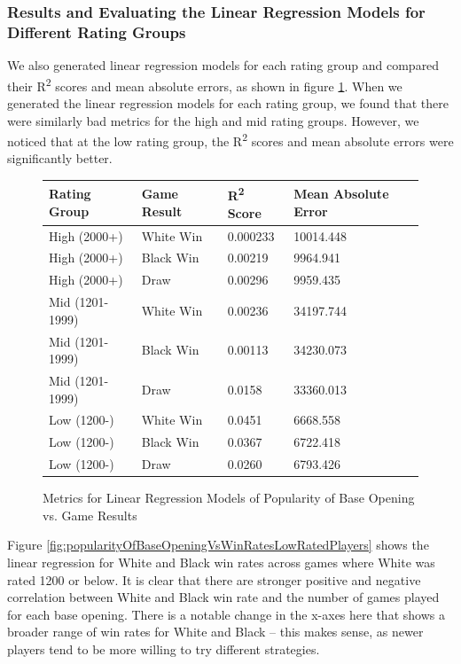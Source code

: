 \documentclass[a4paper, 11pt]{article}
\begin{document}
\subsubsection{Results and Evaluating the Linear Regression Models for Different Rating Groups}
We also generated linear regression models for each rating group and compared their R\textsuperscript{2} scores and mean absolute errors, as shown in figure \ref{fig:metricsForLinearRegressionModelsOfPopularityOfBaseOpeningVsGameResults}. When we generated the linear regression models for each rating group, we found that there were similarly bad metrics for the high and mid rating groups. However, we noticed that at the low rating group, the R\textsuperscript{2} scores and mean absolute errors were significantly better.

\begin{figure}[H]
    \centering
    \caption{Metrics for Linear Regression Models of Popularity of Base Opening vs. Game Results}
    \label{fig:metricsForLinearRegressionModelsOfPopularityOfBaseOpeningVsGameResults}
    \begin{tabular}{| l | l | l | l |} 
        \hline
        \bf{Rating Group} & \bf{Game Result} & \bf{R\textsuperscript{2} Score} & \bf{Mean Absolute Error} \\ [0.5ex] 
        \hline
        High (2000+) & White Win & 0.000233 & 10014.448 \\
        \hline
        High (2000+) & Black Win & 0.00219 & 9964.941 \\
        \hline
        High (2000+) & Draw & 0.00296 & 9959.435 \\
        \hline
        Mid (1201-1999) & White Win & 0.00236 & 34197.744 \\
        \hline
        Mid (1201-1999) & Black Win & 0.00113 & 34230.073 \\
        \hline
        Mid (1201-1999) & Draw & 0.0158 & 33360.013 \\
        \hline
        Low (1200-) & White Win & 0.0451 & 6668.558 \\
        \hline
        Low (1200-) & Black Win & 0.0367 & 6722.418 \\
        \hline
        Low (1200-) & Draw & 0.0260 & 6793.426 \\
        \hline
    \end{tabular}
\end{figure}

Figure \ref{fig:popularityOfBaseOpeningVsWinRatesLowRatedPlayers} shows the linear regression for White and Black win rates across games where White was rated 1200 or below. It is clear that there are stronger positive and negative correlation between White and Black win rate and the number of games played for each base opening. There is a notable change in the x-axes here that shows a broader range of win rates for White and Black -- this makes sense, as newer players tend to be more willing to try different strategies.
\end{document}
